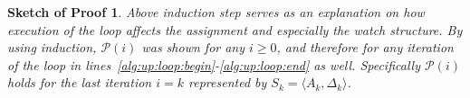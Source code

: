 \documentclass[final]{vutinfth} %
\newtheorem{proof-sketch}{Sketch of Proof}[chapter]
\newcommand{\negweak}[1]{\overline{#1}^w}
\newcommand{\ass}{A}
\newcommand{\fabef}{\ass_{i}}
\newcommand{\faaf}{\ass_{i + 1}}
\newcommand{\abef}{\fabef{k + i}}
\newcommand{\aaf}{\faaf^{k + i + 1}}
\newcommand{\dbef}{\Delta_{i}}
\newcommand{\sgl}{\mu}
\newcommand{\bsgl}{\sigma}
\begin{document}
\begin{proof-sketch}
\begin{comment}
\end{enumerate}
\item To show that $\delta$ is not unit under $\aaf$:
\begin{enumerate}
\item Assume $\delta$ is satisfied under $\abef$. Then $\delta$ is not unit under $\aaf$ because $\abef \subset \aaf$.
\item Assume $\delta$ is not satisfied under $\abef$. Then there are at least two literals $\bsgl_1, \bsgl_2, \ldots \in \delta$ that are unassigned wrt.~$\abef$, as $\delta$ is not unit under $\abef$ (inv2). Further, $\delta \in \dbef^\pm(\bsgl_1)$ and $\delta \in \dbef^\pm(\bsgl_2)$ (inv3). From $\delta \not \in \dbef^\pm(\sgl_i)$ it follows that $\sgl_i \not = \bsgl_1$ and $\sgl_i \not = \bsgl_2$. %
Therefore $\delta$ is not unit, because $\bsgl_1, \bsgl_2 \in \delta$ are unassigned wrt.~$\aaf$.
\end{enumerate}
\item Assume $\delta$ is not satisfied under $\aaf$ and contains at least two literals $\bsgl_1, \bsgl_2, \ldots$ unassigned under $\aaf$. Then $\bsgl_1, \bsgl_2$ are unassigned wrt.~$\abef$ and $\delta$ is not satisfied wrt.~$\abef$ because $\abef \subset \aaf$ and $\delta \not \in \dbef^\pm(\sgl_i)$ and $\delta$ is not unit wrt.~$\abef$.
\item Same as 1.d ...
\end{enumerate}
\item Else ($\delta \in \dbef^\pm(\sgl_i)$), i.e.~$\delta$ was watched on $\sgl_i$.
\begin{enumerate}
\item If $\delta$ is weakly unit under $\aaf$ with $\bsgl$ unassigned, then the algorithm generates the assignment $\negweak{\bsgl}$.
\item Else
\item If there are two unassigned pointer move $\to$ two unassigned literals
\item pointer move $\to$ two unassigned literals
\item violated $\to$ conflict
\item weakly unit $\to$ satisfied
\end{enumerate}
\end{enumerate}
\end{enumerate}
\end{comment}

Above induction step serves as an explanation on how execution of the loop affects the assignment and especially the watch structure. By using induction, $\mathcal{P}(i)$ was shown for any $i \geq 0$, and therefore for any iteration of the loop in lines~\ref{alg:up:loop:begin}-\ref{alg:up:loop:end} as well. Specifically $\mathcal{P}(i)$ holds for the last iteration $i = k$ represented by $S_k = \langle \ass_k, \Delta_k \rangle$.


\end{proof-sketch}
\end{document}
